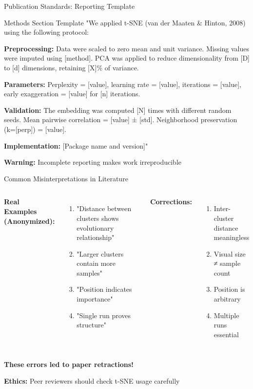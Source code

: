 \documentclass[aspectratio=169]{beamer}
\newcommand{\warning}[1]{\colorbox{red!10}{\textcolor{warningcolor}{\textbf{Warning:} #1}}}
\newcommand{\ethics}[1]{\colorbox{purple!10}{\textcolor{ethicscolor}{\textbf{Ethics:} #1}}}
\begin{document}
\begin{frame}{Publication Standards: Reporting Template}
\begin{block}{Methods Section Template}
"We applied t-SNE (van der Maaten \& Hinton, 2008) using the following protocol:

\textbf{Preprocessing:} Data were scaled to zero mean and unit variance. Missing values were imputed using [method]. PCA was applied to reduce dimensionality from [D] to [d] dimensions, retaining [X]\% of variance.

\textbf{Parameters:} Perplexity = [value], learning rate = [value], iterations = [value], early exaggeration = [value] for [n] iterations.

\textbf{Validation:} The embedding was computed [N] times with different random seeds. Mean pairwise correlation = [value] ± [std]. Neighborhood preservation (k=[perp]) = [value].

\textbf{Implementation:} [Package name and version]"
\end{block}

\warning{Incomplete reporting makes work irreproducible}
\end{frame}

\begin{frame}{Common Misinterpretations in Literature}
\begin{columns}
\textbf{Real Examples (Anonymized):}
\begin{enumerate}
\item "Distance between clusters shows evolutionary relationship"
\item "Larger clusters contain more samples"
\item "Position indicates importance"
\item "Single run proves structure"
\end{enumerate}

\textbf{Corrections:}
\begin{enumerate}
\item Inter-cluster distance meaningless
\item Visual size ≠ sample count
\item Position is arbitrary
\item Multiple runs essential
\end{enumerate}
\end{columns}

\vspace{0.3cm}
\colorbox{red!30}{\textbf{These errors led to paper retractions!}}

\ethics{Peer reviewers should check t-SNE usage carefully}
\end{frame}
\end{document}
